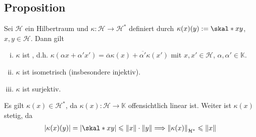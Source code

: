 \subsection{Proposition} %
\label{sub:711}
Sei $\mathcal{H}$ ein Hilbertraum und $\kappa \colon \mathcal{H} \to \mathcal{H}^*$ definiert durch $\kappa(x)(y) := \skal*{x}{y}$, $x,y \in \mathcal{H}$. Dann gilt
\begin{enumerate}[(i)]
	\item $\kappa$ ist , d.h. $\kappa(\alpha x+ \alpha' x') = \overline{\alpha} \kappa(x) + \overline{\alpha'}\kappa(x')$ mit $x,x' \in \mathcal{H}$, 
	$\alpha, \alpha' \in \mathds{K}$.
	\item $\kappa$ ist isometrisch (insbesondere injektiv).
	\item $\kappa$ ist surjektiv.
\end{enumerate}
Es gilt $\kappa(x) \in \mathcal{H}^*$, da $\kappa(x) \colon \mathcal{H} \to \mathds{K}$ offensichtlich linear ist. Weiter ist $\kappa(x)$ stetig, da
\begin{align*}
	\abs*{\kappa(x)(y)}= \abs*{\skal*{x}{y}}  \le \norm{x} \cdot \norm{y}  \Longrightarrow \norm[\mathcal{H}^*]{\kappa(x)} \le \norm{x}  
\end{align*}
